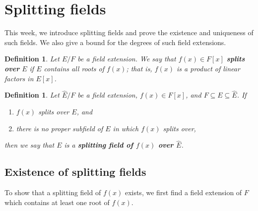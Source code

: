 \documentclass[10pt]{article}
\theoremstyle{newstyle}
\newtheorem{defn}[thm]{Definition}
\begin{document}
\newpage 
\section{Splitting fields}

This week, we introduce splitting fields and prove the existence and uniqueness of such fields.
We also give a bound for the degrees of such field extensions. 

\begin{defn}
Let $E/F$ be a field extension. We say that $f(x) \in F[x]$ {\bf splits over} $E$ if $E$ 
contains all roots of $f(x)$; that is, $f(x)$ is a product of linear factors in $E[x]$.
\end{defn}

\begin{defn}
Let $\widehat{E} / F$ be a field extension, $f(x) \in F[x]$, and $F \subseteq E \subseteq \widehat{E}$.
If 
\begin{enumerate}[(1)]
    \item $f(x)$ splits over $E$, and 
    \item there is no proper subfield of $E$ in which $f(x)$ splits over,
\end{enumerate}
then we say that $E$ is a {\bf splitting field of $f(x)$ over $\widehat{E}$}.
\end{defn}

\subsection{Existence of splitting fields}

To show that a splitting field of $f(x)$ exists, we first find a field extension of $F$ 
which contains at least one root of $f(x)$.
\end{document}
